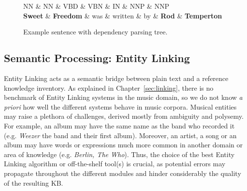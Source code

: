 \begin{figure}[!htb]
\centering
\begin{dependency}
\begin{deptext}[column sep=.0cm]
NN \& NN \& VBD \& VBN \& IN \& NNP \& NNP \\
\textbf{Sweet} \& \textbf{Freedom} \& was \& written \& by \& \textbf{Rod} \& \textbf{Temperton} \\
\end{deptext}




\end{dependency}
\vspace*{-5mm}
\caption{Example sentence with dependency parsing tree.}
\label{fig:kb:sampletree}
\end{figure}


\subsection{Semantic Processing: Entity Linking}
\label{sec:kb:method:entitylinking}

Entity Linking acts as a semantic bridge between plain text and a reference knowledge inventory. %
As explained in Chapter~\ref{sec:linking}, there is no benchmark of Entity Linking systems in the music domain, so we do not know \textit{a priori} how well the different systems behave in music corpora. Musical entities may raise a plethora of challenges, derived mostly from ambiguity and polysemy. For example, an album may have the same name as the band who recorded it (e.g. \textit{Weezer} the band and their first album). Moreover, an artist, a song or an album may have words or expressions much more common in another domain or area of knowledge (e.g. \textit{Berlin, The Who}). Thus, the choice of the best Entity Linking algorithm or off-the-shelf tool(s) is crucial, as potential errors may propagate throughout the different modules and hinder considerably the quality of the resulting KB.

